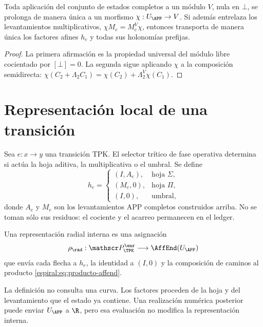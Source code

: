 \begin{proposition}
Toda aplicación del conjunto de estados completos a un módulo \(V\), nula
en \(\bot\), se prolonga de manera única a un morfismo
\(\chi:U_{\APP}\to V\). Si además entrelaza los levantamientos
multiplicativos, \(\chi M_e=M_e^V\chi\), entonces transporta de manera única
los factores afines \(h_e\) y todas sus holonomías prefijas.
\end{proposition}
\begin{proof}
La primera afirmación es la propiedad universal del módulo libre cocientado
por \([\bot]=0\). La segunda sigue aplicando \(\chi\) a la composición
semidirecta: \(\chi(C_2+\Lambda_2C_1)=
\chi(C_2)+\Lambda_2^V\chi(C_1)\).
\end{proof}

\section{Representación local de una transición}

Sea \(e:x\to y\) una transición TPK. El selector trítico de fase operativa
determina si actúa la hoja aditiva, la multiplicativa o el umbral. Se define
\begin{equation}
 h_e=
 \begin{cases}
 (I,A_e),&\text{hoja }\Sigma,\\
 (M_e,0),&\text{hoja }\Pi,\\
 (I,0),&\text{umbral},
 \end{cases}
 \label{espiral:eq:factor-afin-local}
\end{equation}
donde \(A_e\) y \(M_e\) son los levantamientos APP completos construidos
arriba. No se toman sólo sus residuos: el cociente y el acarreo permanecen
en el ledger.

\begin{definition}
Una representación radial interna es una asignación
\[
 \rho_{\rad}:\mathscr P_{\TPK}^{\enr}
 \longrightarrow\AffEnd(U_{\APP})
\]
que envía cada flecha a \(h_e\), la identidad a \((I,0)\) y la composición
de caminos al producto \cref{espiral:eq:producto-affend}.
\end{definition}

La definición no consulta una curva. Los factores proceden de la hoja y del
levantamiento que el estado ya contiene. Una realización numérica posterior
puede enviar \(U_{\APP}\) a \(\R\), pero esa evaluación no modifica la
representación interna.

